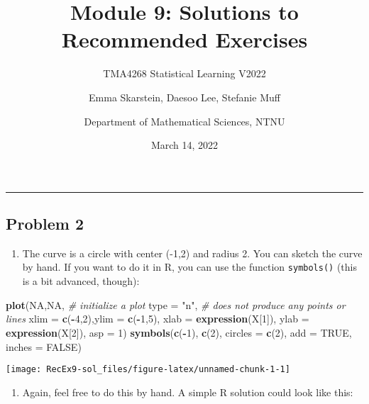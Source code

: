 \documentclass[]{article}
\title{Module 9: Solutions to Recommended Exercises}
\subtitle{TMA4268 Statistical Learning V2022}
\author{Emma Skarstein, Daesoo Lee, Stefanie Muff \and Department of Mathematical Sciences, NTNU}
\date{March 14, 2022}
\newenvironment{Shaded}{\begin{snugshade}}{\end{snugshade}}
\newcommand{\CommentTok}[1]{\textcolor[rgb]{0.56,0.35,0.01}{\textit{#1}}}
\newcommand{\DataTypeTok}[1]{\textcolor[rgb]{0.13,0.29,0.53}{#1}}
\newcommand{\DecValTok}[1]{\textcolor[rgb]{0.00,0.00,0.81}{#1}}
\newcommand{\KeywordTok}[1]{\textcolor[rgb]{0.13,0.29,0.53}{\textbf{#1}}}
\newcommand{\NormalTok}[1]{#1}
\newcommand{\OperatorTok}[1]{\textcolor[rgb]{0.81,0.36,0.00}{\textbf{#1}}}
\newcommand{\OtherTok}[1]{\textcolor[rgb]{0.56,0.35,0.01}{#1}}
\newcommand{\StringTok}[1]{\textcolor[rgb]{0.31,0.60,0.02}{#1}}
\providecommand{\tightlist}{%
  \setlength{\itemsep}{0pt}\setlength{\parskip}{0pt}}
\begin{document}
\maketitle

\begin{center}\rule{0.5\linewidth}{0.5pt}\end{center}

\hypertarget{problem-2}{%
\subsection{Problem 2}\label{problem-2}}

\begin{enumerate}
\def\labelenumi{\alph{enumi})}
\tightlist
\item
  The curve is a circle with center (-1,2) and radius 2. You can sketch
  the curve by hand. If you want to do it in R, you can use the function
  \texttt{symbols()} (this is a bit advanced, though):
\end{enumerate}

\begin{Shaded}
\begin{Highlighting}[]
\KeywordTok{plot}\NormalTok{(}\OtherTok{NA}\NormalTok{,}\OtherTok{NA}\NormalTok{, }\CommentTok{# initialize a plot}
     \DataTypeTok{type =} \StringTok{"n"}\NormalTok{, }\CommentTok{# does not produce any points or lines}
     \DataTypeTok{xlim =} \KeywordTok{c}\NormalTok{(}\OperatorTok{-}\DecValTok{4}\NormalTok{,}\DecValTok{2}\NormalTok{),}\DataTypeTok{ylim =} \KeywordTok{c}\NormalTok{(}\OperatorTok{-}\DecValTok{1}\NormalTok{,}\DecValTok{5}\NormalTok{), }\DataTypeTok{xlab =} \KeywordTok{expression}\NormalTok{(X[}\DecValTok{1}\NormalTok{]), }\DataTypeTok{ylab =} \KeywordTok{expression}\NormalTok{(X[}\DecValTok{2}\NormalTok{]),}
     \DataTypeTok{asp =} \DecValTok{1}\NormalTok{)}
\KeywordTok{symbols}\NormalTok{(}\KeywordTok{c}\NormalTok{(}\OperatorTok{-}\DecValTok{1}\NormalTok{), }\KeywordTok{c}\NormalTok{(}\DecValTok{2}\NormalTok{), }\DataTypeTok{circles =} \KeywordTok{c}\NormalTok{(}\DecValTok{2}\NormalTok{), }\DataTypeTok{add =} \OtherTok{TRUE}\NormalTok{,  }\DataTypeTok{inches =} \OtherTok{FALSE}\NormalTok{)}
\end{Highlighting}
\end{Shaded}

\texttt{[image: RecEx9-sol\_files/figure-latex/unnamed-chunk-1-1]}

\begin{enumerate}
\def\labelenumi{\alph{enumi})}
\setcounter{enumi}{1}
\tightlist
\item
  Again, feel free to do this by hand. A simple R solution could look
  like this:
\end{enumerate}
\end{document}
